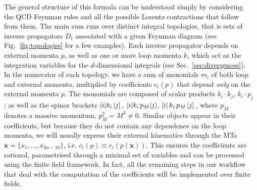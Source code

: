 \documentclass[main.tex]{subfiles}
\begin{document}
The general structure of this formula can be understood simply by considering the QCD Feynman rules and all the possible Lorentz contractions that follow from them. The main sum runs over distinct integral topologies, that is sets of inverse propagators $D_t$ associated with a given Feynman diagram (see Fig.~\ref{fig:topologies} for a few examples). Each inverse propagator depends on external momenta $p$, as well as one or more loop momenta $k$, which act as the integration variables for the $d$-dimensional integrals (see Sec.~\ref{sec:divergences}). In the numerator of each topology, we have a sum of monomials $m_i$ of both loop and external momenta, multiplied by coefficients $c_i(p)$ that depend \textit{only} on the external momenta $p$. The monomials are composed of scalar products $k_i \cdot k_j,\, k_i\cdot p_j$; as well as the spinor brackets $\langle i |k_i \left| j \right],\, \langle i|k_i \, p_M|j \rangle,\, \left[ i \right|k_i \, p_M \left| j \right]\,$, where $p_M$ denotes a massive momentum, $p_M^2 = M^2 \neq 0$. Similar objects appear in their coefficients, but because they do not contain any dependence on the loop momenta, we will usually express their external kinematics through the MTs $\mathbf{x} = \{x_1, \ldots, x_{3n-10}\}$, i.e. $c_i(p) \equiv c_i(p(\mathbf{x}))$. This ensures the coefficients are rational, parametrised through a minimal set of variables and can be processed using the finite field framework. In fact, all the remaining steps in our workflow that deal with the computation of the coefficients will be implemented over finite fields. 
\end{document}
